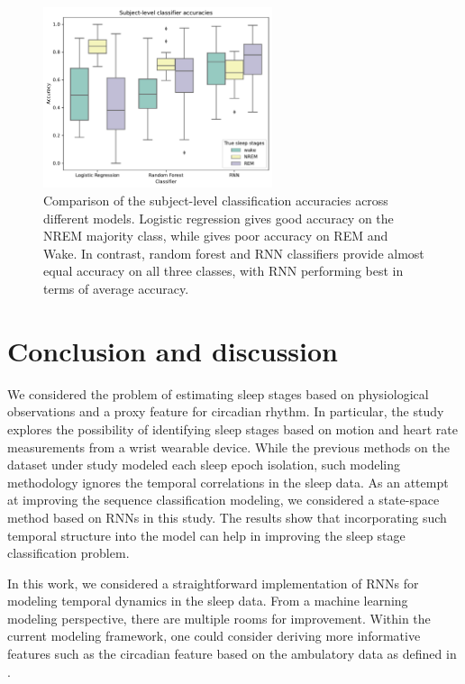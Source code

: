 \documentclass[12pt]{article}
\begin{document}
\begin{figure}
\centering
\includegraphics[width=0.6\textwidth]{figures/subject_level_accuracy.pdf}
\caption{Comparison of the subject-level classification accuracies across different models. Logistic regression gives good accuracy on the NREM majority class, while gives poor accuracy on REM and Wake. In contrast, random forest and RNN classifiers provide almost equal accuracy on all three classes, with RNN performing best in terms of average accuracy.}
\label{fig:subject_level_accuracy}
\end{figure}

\section{Conclusion and discussion}
We considered the problem of estimating sleep stages based on physiological observations and a proxy feature for circadian rhythm. In particular, the study explores the possibility of identifying sleep stages based on motion and heart rate measurements from a wrist wearable device. While the previous methods on the dataset under study modeled each sleep epoch isolation, such modeling methodology ignores the temporal correlations in the sleep data. As an attempt at improving the sequence classification modeling, we considered a state-space method based on RNNs in this study. The results show that incorporating such temporal structure into the model can help in improving the sleep stage classification problem. 

In this work, we considered a straightforward implementation of RNNs for modeling temporal dynamics in the sleep data. From a machine learning modeling perspective, there are multiple rooms for improvement. Within the current modeling framework, one could consider deriving more informative features such as the circadian feature based on the ambulatory data as defined in \citet{walch2019}. 
\end{document}
